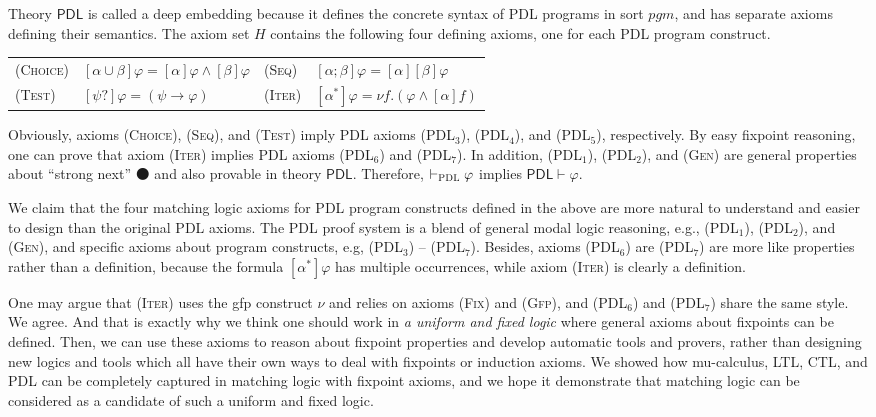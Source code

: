 \documentclass[letter,12pt]{article}
\newcommand{\imp}{\to}
\newcommand{\MLPDL}{\mathsf{PDL}}
\newcommand{\prule}[1]{\textsc{(#1)}}
\newcommand{\Gfp}{\prule{Gfp}\xspace}
\newcommand{\Fix}{\prule{Fix}\xspace}
\newcommand{\snext}{{\medbullet}}
\newcommand{\pgm}{\mathit{pgm}}
\newcommand{\PDL}{\textsc{PDL}}
\newcommand{\PDLseq}{\mathbin{;}}
\newcommand{\PDLunion}{\mathbin{\cup}}
\newcommand{\PDLstar}{^*}
\newcommand{\PDLquestion}{{?}}
\begin{document}
Theory $\MLPDL$ is called a deep embedding because
it defines the concrete syntax of PDL programs in sort $\pgm$,
and has separate axioms defining their semantics.
The axiom set $H$ contains the following four
defining axioms, one for each PDL program construct.
\begin{center}
\begin{tabular}{llll}
\prule{Choice} & $[\alpha \PDLunion \beta] \varphi = [\alpha] \varphi \wedge [\beta] \varphi$&
\prule{Seq} & $[\alpha \PDLseq \beta] \varphi = [\alpha][\beta]\varphi$
\\
\prule{Test} & $[\psi \PDLquestion] \varphi = (\psi \imp \varphi)$ &
\prule{Iter} & $[\alpha \PDLstar] \varphi = \nu f . (\varphi \wedge [\alpha] f)$
\end{tabular}
\end{center}

Obviously, axioms \prule{Choice}, \prule{Seq}, and \prule{Test}
imply PDL axioms \prule{PDL$_3$}, \prule{PDL$_4$}, and \prule{PDL$_5$}, respectively.
By easy fixpoint reasoning, one can prove that
axiom \prule{Iter} implies PDL axioms
\prule{PDL$_6$} and \prule{PDL$_7$}.
In addition, \prule{PDL$_1$}, \prule{PDL$_2$}, and \prule{Gen}
are general properties about ``strong next'' $\snext$ and also provable in theory $\MLPDL$.
Therefore, $\vdash_\PDL\varphi$ implies $\MLPDL \vdash \varphi$.

We claim that the four matching logic axioms for PDL program constructs defined in the above
are more natural to understand and easier to design than the original PDL axioms.
The PDL proof system is a blend of
general modal logic reasoning, e.g., \prule{PDL$_1$}, \prule{PDL$_2$}, and \prule{Gen},
and specific axioms about program constructs, e.g, \prule{PDL$_3$} -- \prule{PDL$_7$}.
Besides, axioms \prule{PDL$_6$} are \prule{PDL$_7$} are more like properties
rather than a definition, because
the formula $[\alpha \PDLstar] \varphi$ has multiple occurrences, while 
axiom \prule{Iter} is clearly a definition.

One may argue that \prule{Iter} uses the gfp construct $\nu$
and relies on axioms \Fix and \Gfp,
and \prule{PDL$_6$} and \prule{PDL$_7$} share the same style.
We agree.
And that is exactly why we think one should work in \emph{a uniform and fixed logic}
where general axioms about fixpoints can be defined.
Then, we can use these axioms to reason about fixpoint properties
and develop automatic tools and provers, rather than 
designing new logics and tools which all have their own ways to deal with fixpoints
or induction axioms.
We showed how mu-calculus, LTL, CTL, and PDL can be completely captured in matching logic
with fixpoint axioms, and we hope it demonstrate that matching logic can be considered
as a candidate of such a uniform and fixed logic.
\end{document}
